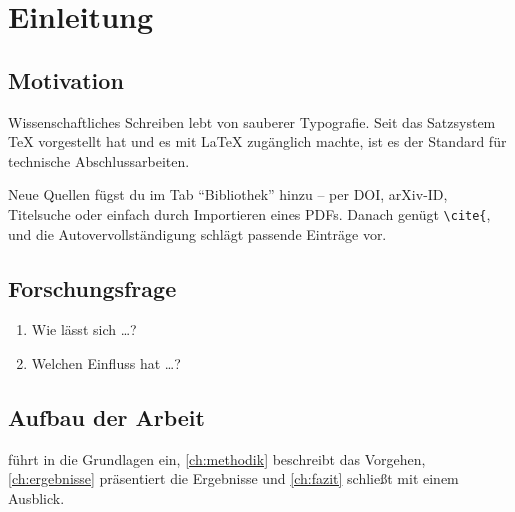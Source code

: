 \chapter{Einleitung}
\label{ch:einleitung}

\section{Motivation}
Wissenschaftliches Schreiben lebt von sauberer Typografie. Seit \citet{knuth1984texbook}
das Satzsystem \TeX{} vorgestellt hat und \citet{lamport1994latex} es mit \LaTeX{}
zugänglich machte, ist es der Standard für technische Abschlussarbeiten.

Neue Quellen fügst du im Tab \enquote{Bibliothek} hinzu -- per DOI, arXiv-ID,
Titelsuche oder einfach durch Importieren eines PDFs. Danach genügt
\verb|\cite{|, und die Autovervollständigung schlägt passende Einträge vor.

\section{Forschungsfrage}
\begin{enumerate}[label=\textbf{F\arabic*}]
  \item Wie lässt sich \dots{}?
  \item Welchen Einfluss hat \dots{}?
\end{enumerate}

\section{Aufbau der Arbeit}
 führt in die Grundlagen ein, \cref{ch:methodik} beschreibt
das Vorgehen, \cref{ch:ergebnisse} präsentiert die Ergebnisse und
\cref{ch:fazit} schließt mit einem Ausblick.
